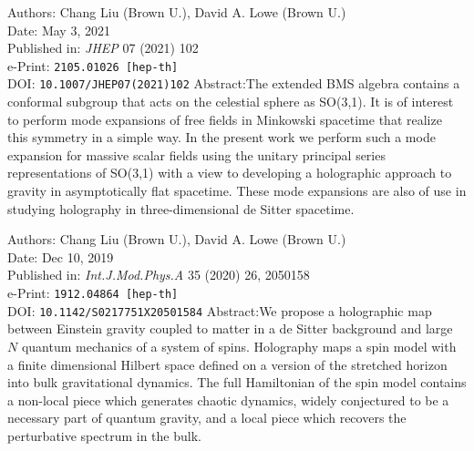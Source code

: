 \documentclass{brownthesis}
\begin{document}
\medbreak
\noindent Authors: Chang Liu (Brown U.), David A. Lowe (Brown U.)\\
Date: May 3, 2021\\
Published in: {\sl JHEP} 07 (2021) 102\\
e-Print: {\tt 2105.01026 [hep-th]}\\
DOI: {\tt 10.1007/JHEP07(2021)102}
\medbreak
\noindent Abstract:\quad The extended BMS algebra contains a conformal subgroup that acts on the celestial sphere as SO(3,1). It is of interest to perform mode expansions of free fields in Minkowski spacetime that realize this symmetry in a simple way. In the present work we perform such a mode expansion for massive scalar fields using the unitary principal series representations of SO(3,1) with a view to developing a holographic approach to gravity in asymptotically flat spacetime. These mode expansions are also of use in studying holography in three-dimensional de Sitter spacetime.
\bigbreak

\medbreak
\noindent Authors: Chang Liu (Brown U.), David A. Lowe (Brown U.)\\
Date: Dec 10, 2019\\
Published in: {\sl Int.J.Mod.Phys.A} 35 (2020) 26, 2050158\\
e-Print: {\tt 1912.04864 [hep-th]}\\
DOI: {\tt 10.1142/S0217751X20501584}
\medbreak
\noindent Abstract:\quad We propose a holographic map between Einstein gravity coupled to matter in a de Sitter background and large $N$ quantum mechanics of a system of spins. Holography maps a spin model with a finite dimensional Hilbert space defined on a version of the stretched horizon into bulk gravitational dynamics. The full Hamiltonian of the spin model contains a non-local piece which generates chaotic dynamics, widely conjectured to be a necessary part of quantum gravity, and a local piece which recovers the perturbative spectrum in the bulk.
\bigbreak
\end{document}
